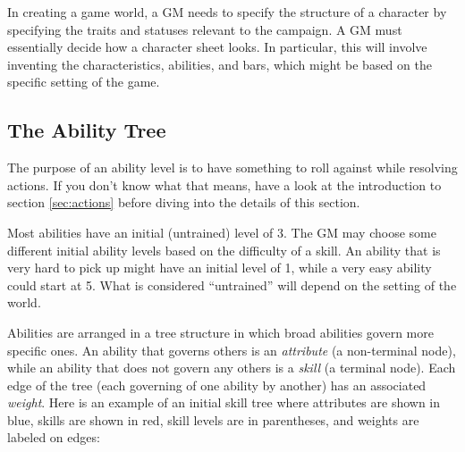 \documentclass[12pt]{article}
\begin{document}
In creating a game world, a GM needs to specify the structure of a character by specifying the traits and statuses relevant to the campaign. A GM must essentially decide how a character sheet looks. In particular, this will involve inventing the characteristics, abilities, and bars, which might be based on the specific setting of the game.

\subsection{The Ability Tree}\label{sec:tree}			

The purpose of an ability level is to have something to roll against while resolving actions. If you don't know what that means, have a look at the introduction to section \ref{sec:actions} before diving into the details of this section.

Most abilities have an initial (untrained) level of 3. The GM may choose some different initial ability levels based on the difficulty of a skill. An ability that is very hard to pick up might have an initial level of 1, while a very easy ability could start at 5. What is considered ``untrained'' will depend on the setting of the world.

Abilities are arranged in a tree structure in which broad abilities govern more specific ones. An ability that governs others is an \emph{attribute} (a non-terminal node), while an ability that does not govern any others is a \emph{skill} (a terminal node). Each edge of the tree (each governing of one ability by another) has an associated \emph{weight}. Here is an example of an initial skill tree where attributes are shown in blue, skills are shown in red, skill levels are in parentheses, and weights are labeled on edges:

\end{document}
